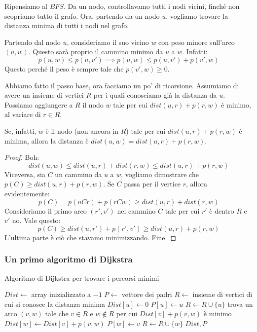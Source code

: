 Ripensiamo al $BFS$. Da un nodo, controllavamo tutti i nodi vicini, finch\'e non scopriamo tutto il grafo. Ora, partendo da un nodo $u$, vogliamo trovare la distanza minima di tutti i nodi nel grafo.

Partendo dal nodo $u$, consideriamo il suo vicino $w$ con peso minore sull'arco $(u,w)$. Questo sar\`a proprio il cammino minimo da $u$ a $w$. Infatti:
\[
p(u,w) \le p(u,v') \implies p(u,w) \le p(u,v') + p(v',w)
\]
Questo perch\'e il peso \`e sempre tale che $p(v',w) \ge 0$.

Abbiamo fatto il passo base, ora facciamo un po' di ricorsione. Assumiamo di avere un insieme di vertici $R$ per i quali conosciamo gi\`a la distanza da $u$. Possiamo aggiungere a $R$ il nodo $w$ tale per cui $dist(u,r) + p(r,w)$ \`e minimo, al variare di $r \in R$.

Se, infatti, $w$ \`e il nodo (non ancora in $R$) tale per cui $dist(u,r) + p(r,w)$ \`e minima, allora la distanza \`e $dist(u,w) = dist(u,r) + p(r,w)$.

\begin{proof}
Boh:
\[
dist(u,w) \le dist(u,r) + dist(r,w) \le dist(u,r) + p(r,w)
\]
Viceversa, sia $C$ un cammino da $u$ a $w$, vogliamo dimostrare che $p(C) \ge dist(u,r) + p(r,w)$. Se $C$ passa per il vertice $r$, allora evidentemente:
\[
p(C) = p(uCr) + p(rCw) \ge dist(u,r) + dist(r,w)
\]
Consideriamo il primo arco $(r',v')$ nel cammino $C$ tale per cui $r'$ \`e dentro $R$ e $v'$ no. Vale questo:
\[
p(C) \ge dist(u,r') + p(r',v') \ge dist(u,r) + p(r,w)
\]
L'ultima parte \`e ci\`o che stavamo minimizzando. Fine.
\end{proof}

\subsubsection{Un primo algoritmo di Dijkstra}

\begin{algorithm}
\caption{\label{dijkstra}Algoritmo di Dijkstra per trovare i percorsi minimi}
\begin{algorithmic}[1]
    \State $Dist \gets$ array inizializzato a $-1$
    \State $P \gets$ vettore dei padri
    \State $R \gets$ insieme di vertici di cui si conosce la distanza minima
    \State $Dist[u] \gets 0$
    \State $P[u] \gets u$
    \State $R \gets R \cup \{ u \}$
        \State trova un arco $(v,w)$ tale che $v \in R$ e $w \notin R$ per cui $Dist[v] + p(v,w)$ \`e minimo
        \State $Dist[w] \gets Dist[v] + p(v,w)$
        \State $P[w] \gets v$
        \State $R \gets R \cup \{ w \}$
    \EndWhile
    \State \Return $Dist, P$
\EndFunction
\end{algorithmic}
\end{algorithm}

